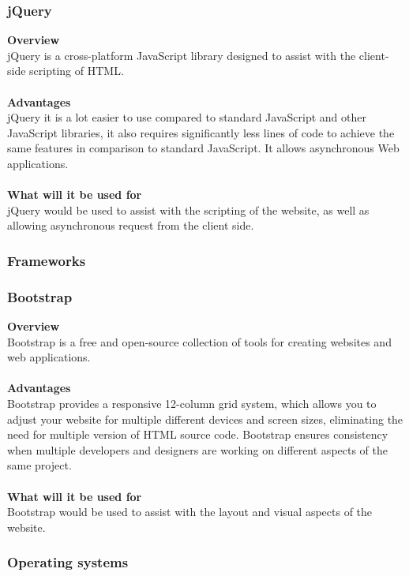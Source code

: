 \documentclass{article}
\begin{document}
\subsubsection*{jQuery}
\textbf{Overview}\\
jQuery is a cross-platform JavaScript library designed to assist with the client-side scripting of HTML.\\\\
\textbf{Advantages}\\
jQuery it is a lot easier to use compared to standard JavaScript and other JavaScript libraries, it also requires significantly less lines of code to achieve the same features in comparison to standard JavaScript. It allows asynchronous Web applications.\\\\
\textbf{What will it be used for}\\
jQuery would be used to assist with the scripting of the website, as well as allowing asynchronous request from the client side.

\subsubsection{Frameworks}
\subsubsection*{Bootstrap}
\textbf{Overview}\\
Bootstrap is a free and open-source collection of tools for creating websites and web applications.\\\\
\textbf{Advantages}\\
Bootstrap provides a responsive 12-column grid system, which allows you to adjust your website for multiple different devices and screen sizes, eliminating the need for multiple version of HTML source code. Bootstrap ensures consistency when multiple developers and designers are working on different aspects of the same project. \\\\
\textbf{What will it be used for}\\
Bootstrap would be used to assist with the layout and visual aspects of the website.

\subsubsection{Operating systems}
\end{document}
